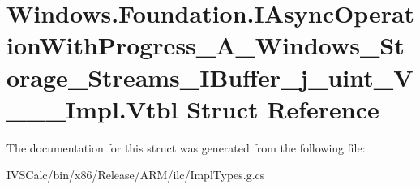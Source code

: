 \hypertarget{struct_windows_1_1_foundation_1_1_i_async_operation_with_progress___a___windows___storage___stre4c1f1cd782ae8d544a67ecdc7540f183}{}\section{Windows.\+Foundation.\+I\+Async\+Operation\+With\+Progress\+\_\+\+A\+\_\+\+Windows\+\_\+\+Storage\+\_\+\+Streams\+\_\+\+I\+Buffer\+\_\+j\+\_\+uint\+\_\+\+V\+\_\+\+\_\+\+\_\+\+Impl.\+Vtbl Struct Reference}
\label{struct_windows_1_1_foundation_1_1_i_async_operation_with_progress___a___windows___storage___stre4c1f1cd782ae8d544a67ecdc7540f183}


The documentation for this struct was generated from the following file\+:\begin{DoxyCompactItemize}
\item 
I\+V\+S\+Calc/bin/x86/\+Release/\+A\+R\+M/ilc/Impl\+Types.\+g.\+cs\end{DoxyCompactItemize}
